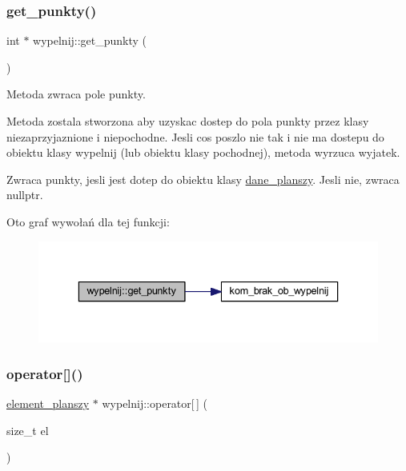 \subsubsection{\texorpdfstring{get\+\_\+punkty()}{get\_punkty()}}
{\footnotesize\ttfamily int $\ast$ wypelnij\+::get\+\_\+punkty (\begin{DoxyParamCaption}{ }\end{DoxyParamCaption})}

Metoda zwraca pole punkty.

Metoda zostala stworzona aby uzyskac dostep do pola punkty przez klasy niezaprzyjaznione i niepochodne. Jesli cos poszlo nie tak i nie ma dostepu do obiektu klasy wypelnij (lub obiektu klasy pochodnej), metoda wyrzuca wyjatek. \begin{DoxyReturn}{Zwraca}
punkty, jesli jest dotep do obiektu klasy \mbox{\hyperlink{classdane__planszy}{dane\+\_\+planszy}}. Jesli nie, zwraca nullptr. 
\end{DoxyReturn}
Oto graf wywołań dla tej funkcji\+:
\nopagebreak
\begin{figure}[H]
\begin{center}
\leavevmode
\includegraphics[width=336pt]{classwypelnij_a5fb16bb1a4571f9c45c665bf3eac1089_cgraph}
\end{center}
\end{figure}
\mbox{\label{classwypelnij_a591374caf7e1350fcad469f47baa41e2}} 
\subsubsection{\texorpdfstring{operator[]()}{operator[]()}}
{\footnotesize\ttfamily \mbox{\hyperlink{classelement__planszy}{element\+\_\+planszy}} $\ast$ wypelnij\+::operator\mbox{[}$\,$\mbox{]} (\begin{DoxyParamCaption}\item[{size\+\_\+t}]{el }\end{DoxyParamCaption})}

